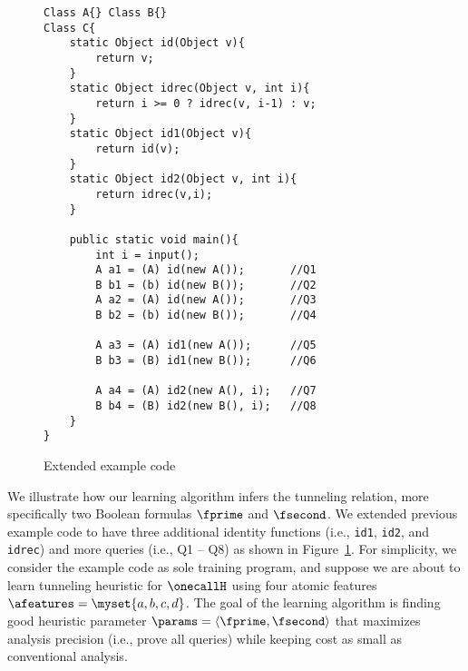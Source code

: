 \begin{figure}
\begin{multicols}{2}
\begin{lstlisting}
Class A{} Class B{}
Class C{
	static Object id(Object v){
		return v;
	}
	static Object idrec(Object v, int i){
		return i >= 0 ? idrec(v, i-1) : v;
	}	
	static Object id1(Object v){
		return id(v);
	}
	static Object id2(Object v, int i){
		return idrec(v,i);
	}

	public static void main(){
		int i = input();
		A a1 = (A) id(new A());       //Q1
		B b1 = (b) id(new B());       //Q2
		A a2 = (A) id(new A());       //Q3
		B b2 = (b) id(new B());       //Q4
		
		A a3 = (A) id1(new A());      //Q5
		B b3 = (B) id1(new B());      //Q6
		
		A a4 = (A) id2(new A(), i);   //Q7
		B b4 = (B) id2(new B(), i);   //Q8
	}
}
\end{lstlisting}
\end{multicols}
\caption{Extended example code}
\label{fig:overview:new}
\end{figure}
We illustrate how our learning algorithm infers the tunneling relation, more specifically two Boolean formulas $\fprime$ and $\fsecond$. We extended previous example code to have three additional identity functions (i.e., \texttt{id1}, \texttt{id2}, and \texttt{idrec}) and more queries (i.e., Q1 -- Q8) as shown in Figure~\ref{fig:overview:new}. For simplicity, we consider the example code as sole training program, and suppose we are about to learn tunneling heuristic for $\onecallH$ using four atomic features $\afeatures=\myset{a, b, c, d}$. The goal of the learning algorithm is finding good heuristic parameter $\params=\langle \fprime, \fsecond \rangle$ that maximizes analysis precision (i.e., prove all queries) while keeping cost as small as conventional analysis.

